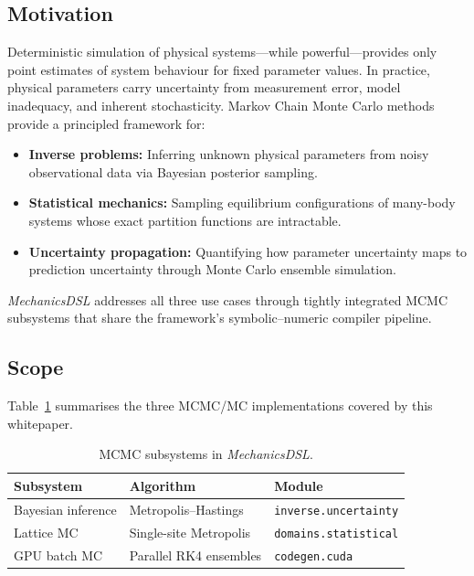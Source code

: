 \documentclass[11pt,letterpaper,twocolumn]{article}
\newcommand{\code}[1]{\texttt{#1}}
\newcommand{\pkg}[1]{\textit{#1}}
\theoremstyle{definition}
\begin{document}
\subsection{Motivation}

Deterministic simulation of physical systems---while powerful---provides only point estimates of system behaviour for fixed parameter values.  In practice, physical parameters carry uncertainty from measurement error, model inadequacy, and inherent stochasticity.  Markov Chain Monte Carlo methods provide a principled framework for:

\begin{itemize}
  \item \textbf{Inverse problems:} Inferring unknown physical parameters from noisy observational data via Bayesian posterior sampling.
  \item \textbf{Statistical mechanics:} Sampling equilibrium configurations of many-body systems whose exact partition functions are intractable.
  \item \textbf{Uncertainty propagation:} Quantifying how parameter uncertainty maps to prediction uncertainty through Monte Carlo ensemble simulation.
\end{itemize}

\noindent
\pkg{MechanicsDSL} addresses all three use cases through tightly integrated MCMC subsystems that share the framework's symbolic--numeric compiler pipeline.

\subsection{Scope}

Table~\ref{tab:subsystems} summarises the three MCMC/MC implementations covered by this whitepaper.

\begin{table}[H]
\centering
\caption{MCMC subsystems in \pkg{MechanicsDSL}.}\label{tab:subsystems}
\small
\setlength{\tabcolsep}{4pt}
\begin{tabular}{@{}p{1.9cm}p{2.1cm}p{2.6cm}@{}}
\toprule
\textbf{Subsystem} & \textbf{Algorithm} & \textbf{Module} \\
\midrule
Bayesian inference  & Metropolis--Hastings & \code{inverse.uncertainty} \\
Lattice MC          & Single-site Metropolis & \code{domains.statistical} \\
GPU batch MC        & Parallel RK4 ensembles & \code{codegen.cuda} \\
\bottomrule
\end{tabular}
\end{table}
\end{document}
